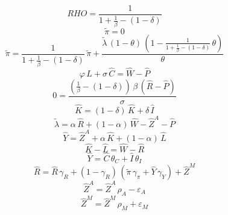 \begin{dmath*}
RHO = \frac{1}{1+\frac{1}{{{\beta}}}-\left(1-{{\delta}}\right)}
\end{dmath*}
\begin{dmath}
{{\tilde{\pi}}}=0
\end{dmath}
\begin{dmath}
{{\tilde{\pi}}}=\frac{1}{1+\frac{1}{{{\beta}}}-\left(1-{{\delta}}\right)}\, {{\tilde{\pi}}}+\frac{{{\tilde{\lambda}}}\, \left(1-{{\theta}}\right)\, \left(1-\frac{1}{1+\frac{1}{{{\beta}}}-\left(1-{{\delta}}\right)}\, {{\theta}}\right)}{{{\theta}}}
\end{dmath}
\begin{dmath}
{{\varphi}}\, {{\hat{L}}}+{{\sigma}}\, {{\hat{C}}}={{\hat{W}}}-{{\hat{P}}}
\end{dmath}
\begin{dmath}
0=\frac{\left(\frac{1}{{{\beta}}}-\left(1-{{\delta}}\right)\right)\, {{\beta}}\, \left({{\hat{R}}}-{{\hat{P}}}\right)}{{{\sigma}}}
\end{dmath}
\begin{dmath}
{{\hat{K}}}=\left(1-{{\delta}}\right)\, {{\hat{K}}}+{{\delta}}\, {{\hat{I}}}
\end{dmath}
\begin{dmath}
{{\tilde{\lambda}}}={{\alpha}}\, {{\hat{R}}}+\left(1-{{\alpha}}\right)\, {{\hat{W}}}-{{\hat{Z}^A}}-{{\hat{P}}}
\end{dmath}
\begin{dmath}
{{\hat{Y}}}={{\hat{Z}^A}}+{{\alpha}}\, {{\hat{K}}}+\left(1-{{\alpha}}\right)\, {{\hat{L}}}
\end{dmath}
\begin{dmath}
{{\hat{K}}}-{{\hat{L}}}={{\hat{W}}}-{{\hat{R}}}
\end{dmath}
\begin{dmath}
{{\hat{Y}}}={{\hat{C}}}\, {{\theta_C}}+{{\hat{I}}}\, {{\theta_I}}
\end{dmath}
\begin{dmath}
{{\hat{R}}}={{\hat{R}}}\, {{\gamma_R}}+\left(1-{{\gamma_R}}\right)\, \left({{\tilde{\pi}}}\, {{\gamma_\pi}}+{{\hat{Y}}}\, {{\gamma_Y}}\right)+{{\hat{Z}^M}}
\end{dmath}
\begin{dmath}
{{\hat{Z}^A}}={{\hat{Z}^A}}\, {{\rho_A}}-{{\varepsilon_A}}
\end{dmath}
\begin{dmath}
{{\hat{Z}^M}}={{\hat{Z}^M}}\, {{\rho_M}}+{{\varepsilon_M}}
\end{dmath}
